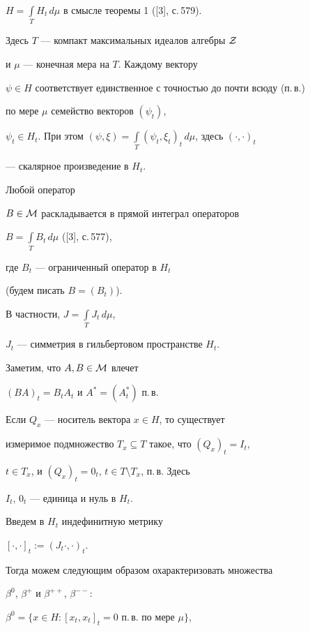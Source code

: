 $H=\int\limits_{T}H_{t}\,d\mu$ в смысле теоремы 1 ([3], с.\,579).


Здесь $T$ --- компакт максимальных идеалов алгебры ${\cal Z}$ 


и $\mu$ --- конечная мера на $T$. Каждому вектору


$\psi\in H$ соответствует единственное с точностью до почти всюду (п.\,в.)


по мере $\mu$ семейство векторов $(\psi_{t})$,


$\psi_{t}\in H_{t}$. При этом $(\psi ,\xi


)=\int\limits_{T}(\psi_{t},\xi_{t})_{t}\,d\mu$, здесь $(\cdot,\cdot)_{t}$


--- скалярное произведение в $H_{t}$. 





Любой оператор


$B\in {\cal M}$ раскладывается в прямой интеграл операторов


$B=\int\limits_{T}B_{t}\,d\mu$ ([3], с.\,577),


где $B_{t}$ --- ограниченный оператор в $H_{t}$


(будем писать $B=(B_{t})$).


В частности, $J=\int\limits_{T}J_{t}\,d\mu$,


$J_{t}$ --- симметрия в гильбертовом пространстве $H_{t}$.


Заметим, что $A, B\in {\cal M}$ влечет


$(BA)_{t}=B_{t}A_{t}$ и $A^{*}=(A_{t}^{*})$ п.\,в.


Если $Q_{x}$ --- носитель вектора $x\in H$, то существует 


измеримое подмножество $T_{x}\subseteq T$ такое, что $(Q_{x})_{t}=I_{t}$, 


$t\in T_{x}$, и $(Q_{x})_{t}=0_{t}$, $t\in T\setminus T_{x}$, п.\,в. Здесь 


$I_{t}$, $0_{t}$ --- единица и нуль в $H_{t}$. 





Введем в $H_{t}$ индефинитную метрику


$[\cdot ,\cdot ]_{t}:=(J_{t}\cdot ,\cdot )_{t}$.


Тогда можем следующим образом охарактеризовать множества


$\beta^{0}$, $\beta^{+}$ и $\beta^{++}$, $\beta^{--}$:


$\beta^{0}=\{x\in H: [x_{t},x_{t}]_{t}=0$ п.\,в. по мере $\mu\}$,


